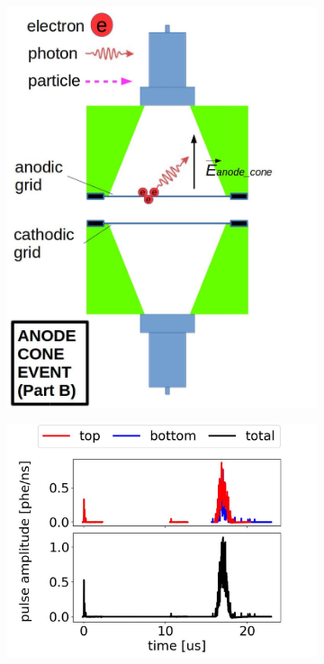 \begin{figure}[!htbp]
\begin{subfigure}[b]{0.8\textwidth}
		\includegraphics[width=\halfwidth,clip,trim={0 0 0 0}]{Figures/GasTest/WeiDrawEvent/AboveAnoB.jpg}
		\caption{}
		\label{fig:anode cone b}
	\end{subfigure}
	\par\bigskip
	\begin{subfigure}[b]{0.7\textwidth}
		\centering
		\includegraphics[width=\figurewidth,clip,trim={0 0 0 0}]{Figures/GasTest/exampleWaveforms/proc64767AnodeCone1.jpg}

\end{subfigure}
\end{figure}
